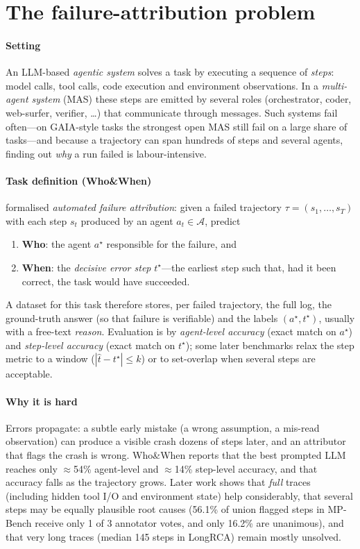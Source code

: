 \section{The failure-attribution problem}\label{sec:intro}

\paragraph{Setting} An LLM-based \emph{agentic system} solves a task by executing a sequence of \emph{steps}: model calls, tool calls, code execution and environment observations. In a \emph{multi-agent system} (MAS) these steps are emitted by several roles (orchestrator, coder, web-surfer, verifier, \dots) that communicate through messages. Such systems fail often---on GAIA-style tasks the strongest open MAS still fail on a large share of tasks---and because a trajectory can span hundreds of steps and several agents, finding out \emph{why} a run failed is labour-intensive.

\paragraph{Task definition (Who\&When)} \citet{zhang2025who} formalised \emph{automated failure attribution}: given a failed trajectory $\tau=(s_1,\dots,s_T)$ with each step $s_t$ produced by an agent $a_t\in\mathcal{A}$, predict
\begin{enumerate}
\item \textbf{Who}: the agent $a^\star$ responsible for the failure, and
\item \textbf{When}: the \emph{decisive error step} $t^\star$---the earliest step such that, had it been correct, the task would have succeeded.
\end{enumerate}
A dataset for this task therefore stores, per failed trajectory, the full log, the ground-truth answer (so that failure is verifiable) and the labels $(a^\star,t^\star)$, usually with a free-text \emph{reason}. Evaluation is by \emph{agent-level accuracy} (exact match on $a^\star$) and \emph{step-level accuracy} (exact match on $t^\star$); some later benchmarks relax the step metric to a window ($|{\hat t}-t^\star|\le k$) or to set-overlap when several steps are acceptable.

\paragraph{Why it is hard} Errors propagate: a subtle early mistake (a wrong assumption, a mis-read observation) can produce a visible crash dozens of steps later, and an attributor that flags the crash is wrong. Who\&When reports that the best prompted LLM reaches only $\approx$54\% agent-level and $\approx$14\% step-level accuracy, and that accuracy falls as the trajectory grows. Later work shows that \emph{full} traces (including hidden tool I/O and environment state) help considerably, that several steps may be equally plausible root causes (56.1\% of union flagged steps in MP-Bench receive only 1 of 3 annotator votes, and only 16.2\% are unanimous), and that very long traces (median 145 steps in LongRCA) remain mostly unsolved.

